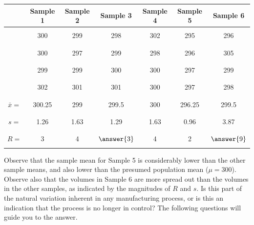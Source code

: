 \documentclass{ximera}
\begin{document}
\begin{center}
\begin{tabular}{|c|c|c|c|c|c|c|}
& Sample 1 & Sample 2 & Sample 3 & Sample 4 & Sample 5 & Sample 6  \\
 \hline
 \hline
   & & & & & &\\
 &300 & 299 & 298 & 302 & 295 &296 \\
  & & & & & &\\
  & & & & & &\\
 &300 & 297 & 299 & 298 & 296 & 305\\
  & & & & & &\\
 & & & & & &\\
 &299 & 299 & 300 & 300 & 297 & 299 \\
  & & & & & &\\
  & & & & & &\\
 &302 & 301  & 301 & 300 &297 & 298 \\
  & & & & & &\\
 \hline
 \hline
  & & & & & &\\
 $\bar{x}=$ & 300.25 & 299  & 299.5 & 300 & 296.25 & 299.5 \\
  & & & & & &\\
  \hline
  & & & & & &\\
 $s=$ & 1.26 & 1.63  & 1.29 & 1.63 & 0.96 & 3.87 \\
  & & & & & &\\
 \hline
   & & & & & &\\
 $R=$ & 3 & 4  & $\answer{3}$ & 4 & 2 & $\answer{9}$ \\
  & & & & & &\\
 \hline
\end{tabular}
\end{center}

Observe that the sample mean for Sample 5 is considerably lower than the other sample means, and also lower than the presumed population mean ($\mu=300$).  Observe also that the volumes in Sample 6 are more spread out than the volumes in the other samples, as indicated by the magnitudes of $R$ and $s$.  Is this part of the natural variation inherent in any manufacturing process, or is this an indication that the process is no longer in control?  The following questions will guide you to the answer.
\end{document}
